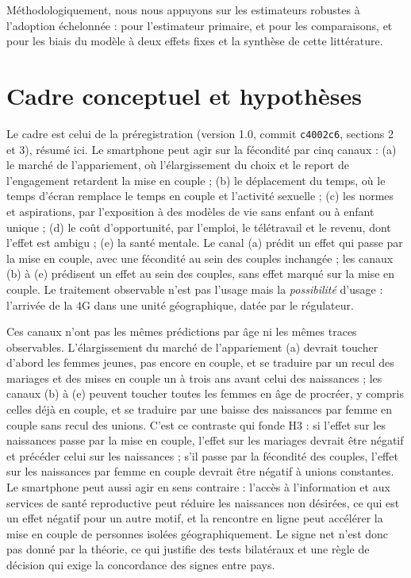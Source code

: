 \documentclass[11pt,a4paper]{article}
\begin{document}
Méthodologiquement, nous nous appuyons sur les estimateurs robustes à l'adoption échelonnée : \citet{callaway2021} pour l'estimateur primaire, \citet{sun2021} et \citet{gardner2022} pour les comparaisons, \citet{dechaisemartin2020} et \citet{roth2023} pour les biais du modèle à deux effets fixes et la synthèse de cette littérature.

\section{Cadre conceptuel et hypothèses}

Le cadre est celui de la préregistration (version 1.0, commit \texttt{c4002c6}, sections 2 et 3), résumé ici. Le smartphone peut agir sur la fécondité par cinq canaux : (a) le marché de l'appariement, où l'élargissement du choix et le report de l'engagement retardent la mise en couple ; (b) le déplacement du temps, où le temps d'écran remplace le temps en couple et l'activité sexuelle ; (c) les normes et aspirations, par l'exposition à des modèles de vie sans enfant ou à enfant unique ; (d) le coût d'opportunité, par l'emploi, le télétravail et le revenu, dont l'effet est ambigu ; (e) la santé mentale. Le canal (a) prédit un effet qui passe par la mise en couple, avec une fécondité au sein des couples inchangée ; les canaux (b) à (e) prédisent un effet au sein des couples, sans effet marqué sur la mise en couple. Le traitement observable n'est pas l'usage mais la \emph{possibilité} d'usage : l'arrivée de la 4G dans une unité géographique, datée par le régulateur.

Ces canaux n'ont pas les mêmes prédictions par âge ni les mêmes traces observables. L'élargissement du marché de l'appariement (a) devrait toucher d'abord les femmes jeunes, pas encore en couple, et se traduire par un recul des mariages et des mises en couple un à trois ans avant celui des naissances ; les canaux (b) à (e) peuvent toucher toutes les femmes en âge de procréer, y compris celles déjà en couple, et se traduire par une baisse des naissances par femme en couple sans recul des unions. C'est ce contraste qui fonde H3 : si l'effet sur les naissances passe par la mise en couple, l'effet sur les mariages devrait être négatif et précéder celui sur les naissances ; s'il passe par la fécondité des couples, l'effet sur les naissances par femme en couple devrait être négatif à unions constantes. Le smartphone peut aussi agir en sens contraire : l'accès à l'information et aux services de santé reproductive peut réduire les naissances non désirées, ce qui est un effet négatif pour un autre motif, et la rencontre en ligne peut accélérer la mise en couple de personnes isolées géographiquement. Le signe net n'est donc pas donné par la théorie, ce qui justifie des tests bilatéraux et une règle de décision qui exige la concordance des signes entre pays.
\end{document}
